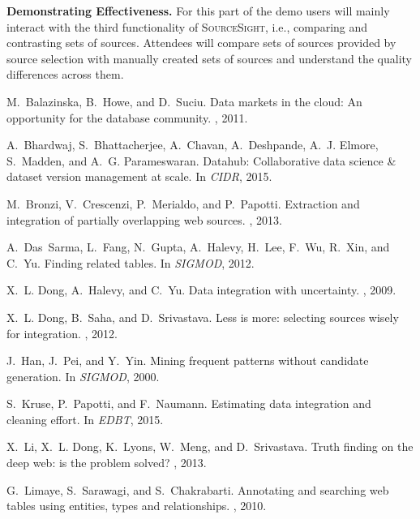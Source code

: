 \documentclass{sig-alternate-05-2015}
\newcommand\system{\textsc{SourceSight}}
\begin{document}
\vspace{2pt}\noindent\textbf{Demonstrating Effectiveness.} For this part of the demo users will mainly interact with the third functionality of \system, i.e., comparing and contrasting sets of sources. Attendees will compare sets of sources provided by source selection with manually created sets of sources and understand the quality differences across them. 

{\scriptsize
\begin{thebibliography}{10}

M.~Balazinska, B.~Howe, and D.~Suciu.
\newblock Data markets in the cloud: An opportunity for the database community.
, 2011.

A.~Bhardwaj, S.~Bhattacherjee, A.~Chavan, A.~Deshpande, A.~J. Elmore,
  S.~Madden, and A.~G. Parameswaran.
\newblock Datahub: Collaborative data science \& dataset version management at
  scale.
\newblock In {\em CIDR}, 2015.

M.~Bronzi, V.~Crescenzi, P.~Merialdo, and P.~Papotti.
\newblock Extraction and integration of partially overlapping web sources.
, 2013.

A.~Das~Sarma, L.~Fang, N.~Gupta, A.~Halevy, H.~Lee, F.~Wu, R.~Xin, and C.~Yu.
\newblock Finding related tables.
\newblock In {\em SIGMOD}, 2012.

X.~L. Dong, A.~Halevy, and C.~Yu.
\newblock Data integration with uncertainty.
, 2009.

X.~L. Dong, B.~Saha, and D.~Srivastava.
\newblock Less is more: selecting sources wisely for integration.
, 2012.

J.~Han, J.~Pei, and Y.~Yin.
\newblock Mining frequent patterns without candidate generation.
\newblock In {\em SIGMOD}, 2000.

S.~Kruse, P.~Papotti, and F.~Naumann.
\newblock Estimating data integration and cleaning effort.
\newblock In {\em EDBT}, 2015.

X.~Li, X.~L. Dong, K.~Lyons, W.~Meng, and D.~Srivastava.
\newblock Truth finding on the deep web: is the problem solved?
, 2013.

G.~Limaye, S.~Sarawagi, and S.~Chakrabarti.
\newblock Annotating and searching web tables using entities, types and
  relationships.
, 2010.


\end{thebibliography}}
\end{document}
